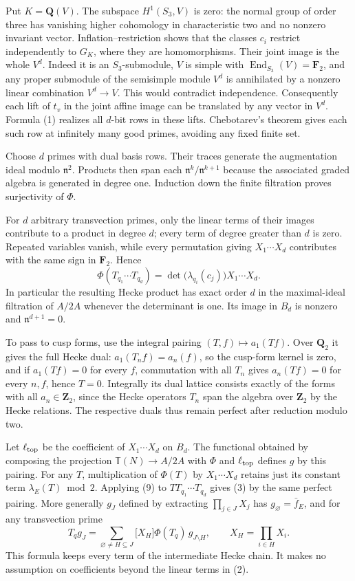 \documentclass[11pt]{article}
\newcommand{\F}{\mathbf F_2}
\newcommand{\Q}{\mathbf Q}
\newcommand{\Z}{\mathbf Z}
\newcommand{\T}{\mathbb T}
\newcommand{\n}{\mathfrak n}
\begin{document}
Put \(K=\Q(V)\). The subspace \(H^1(S_3,V)\) is zero: the normal group of order three has vanishing higher cohomology in characteristic two and no nonzero invariant vector. Inflation--restriction shows that the classes \(c_i\) restrict independently to \(G_K\), where they are homomorphisms. Their joint image is the whole \(V^d\). Indeed it is an \(S_3\)-submodule, \(V\) is simple with \(\operatorname{End}_{S_3}(V)=\F\), and any proper submodule of the semisimple module \(V^d\) is annihilated by a nonzero linear combination \(V^d\to V\). This would contradict independence. Consequently each lift of \(t_v\) in the joint affine image can be translated by any vector in \(V^d\). Formula (1) realizes all \(d\)-bit rows in these lifts. Chebotarev's theorem gives each such row at infinitely many good primes, avoiding any fixed finite set.

Choose \(d\) primes with dual basis rows. Their traces generate the augmentation ideal modulo \(\n^2\). Products then span each \(\n^k/\n^{k+1}\) because the associated graded algebra is generated in degree one. Induction down the finite filtration proves surjectivity of \(\Phi\).

For \(d\) arbitrary transvection primes, only the linear terms of their images contribute to a product in degree \(d\); every term of degree greater than \(d\) is zero. Repeated variables vanish, while every permutation giving \(X_1\cdots X_d\) contributes with the same sign in \(\F\). Hence
\[
 \Phi(T_{q_1}\cdots T_{q_d})
 =\det\bigl(\lambda_{q_i}(c_j)\bigr) X_1\cdots X_d.
\tag{9}
\]
In particular the resulting Hecke product has exact order \(d\) in the maximal-ideal filtration of \(A/2A\) whenever the determinant is one. Its image in \(B_d\) is nonzero and \(\n^{d+1}=0\).

To pass to cusp forms, use the integral pairing \((T,f)\mapsto a_1(Tf)\). Over \(\Q_2\) it gives the full Hecke dual: \(a_1(T_n f)=a_n(f)\), so the cusp-form kernel is zero, and if \(a_1(Tf)=0\) for every \(f\), commutation with all \(T_n\) gives \(a_n(Tf)=0\) for every \(n,f\), hence \(T=0\). Integrally its dual lattice consists exactly of the forms with all \(a_n\in\Z_2\), since the Hecke operators \(T_n\) span the algebra over \(\Z_2\) by the Hecke relations. The respective duals thus remain perfect after reduction modulo two.

Let \(\ell_{\rm top}\) be the coefficient of \(X_1\cdots X_d\) on \(B_d\). The functional obtained by composing the projection \(\T(N)\to A/2A\) with \(\Phi\) and \(\ell_{\rm top}\) defines \(g\) by this pairing. For any \(T\), multiplication of \(\Phi(T)\) by \(X_1\cdots X_d\) retains just its constant term \(\lambda_E(T)\bmod2\). Applying (9) to \(T T_{q_1}\cdots T_{q_d}\) gives (3) by the same perfect pairing. More generally \(g_J\) defined by extracting \(\prod_{j\in J}X_j\) has \(g_{\varnothing}=\bar f_E\), and for any transvection prime
\[
 T_qg_J=\sum_{\varnothing\ne H\subseteq J}
 \bigl[X_H\bigr]\Phi(T_q)\,g_{J\setminus H},
 \qquad X_H=\prod_{i\in H}X_i .
\tag{10}
\]
This formula keeps every term of the intermediate Hecke chain. It makes no assumption on coefficients beyond the linear terms in (2).
\end{document}
